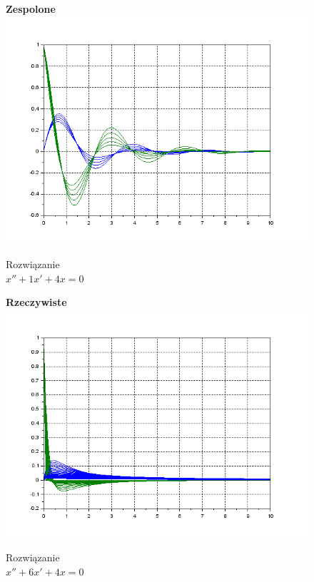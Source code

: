 \documentclass[12pt]{article}
\begin{document}
\begin{figure}[H]
  \centering
  \hspace{-1.6cm}
  \begin{minipage}[b]{0.49\textwidth}
  \hspace{1.6cm}
  \centering
   \textbf{Zespolone}
    \includegraphics[scale=0.47]{./img/5-zespolone-xy-01}
    \caption{Rozwiązanie \\ \centering$x''+1x'+4x=0$}
  \end{minipage}
  \hfill
  \begin{minipage}[b]{0.49\textwidth}
  \centering
  \hspace{1.6cm}
  \textbf{Rzeczywiste}
    \includegraphics[scale=0.47]{./img/5-rzeczywiste-xy-01}
    \caption{Rozwiązanie \\ \centering$x''+6x'+4x=0$}
  \end{minipage}
\end{figure}
\end{document}
